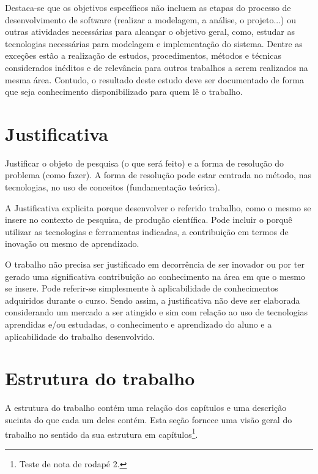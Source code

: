 Destaca-se que os objetivos específicos não incluem as etapas do processo de desenvolvimento de software (realizar a modelagem, a análise, o projeto...) ou outras atividades necessárias para alcançar o objetivo geral, como, estudar as tecnologias necessárias para modelagem e implementação do sistema. Dentre as exceções estão a realização de estudos, procedimentos, métodos e técnicas considerados inéditos e de relevância para outros trabalhos a serem realizados na mesma área. Contudo, o resultado deste estudo deve ser documentado de forma que seja conhecimento disponibilizado para quem lê o trabalho.

\section{Justificativa}\label{sec:justificativa}

Justificar o objeto de pesquisa (o que será feito) e a forma de resolução do problema (como fazer). A forma de resolução pode estar centrada no método, nas tecnologias, no uso de conceitos (fundamentação teórica).

A Justificativa explicita porque desenvolver o referido trabalho, como o mesmo se insere no contexto de pesquisa, de produção científica. Pode incluir o porquê utilizar as tecnologias e ferramentas indicadas, a contribuição em termos de inovação ou mesmo de aprendizado.

O trabalho não precisa ser justificado em decorrência de ser inovador ou por ter gerado uma significativa contribuição ao conhecimento na área em que o mesmo se insere. Pode referir-se simplesmente à aplicabilidade de conhecimentos adquiridos durante o curso. Sendo assim, a justificativa não deve ser elaborada considerando um mercado a ser atingido e sim com relação ao uso de tecnologias aprendidas e/ou estudadas, o conhecimento e aprendizado do aluno e a aplicabilidade do trabalho desenvolvido.

\section{Estrutura do trabalho}\label{sec:estruturaTrabalho}

A estrutura do trabalho contém uma relação dos capítulos e uma descrição sucinta do que cada um deles contém. Esta seção fornece uma visão geral do trabalho no sentido da sua estrutura em capítulos\footnote{Teste de nota de rodapé 2.}.
